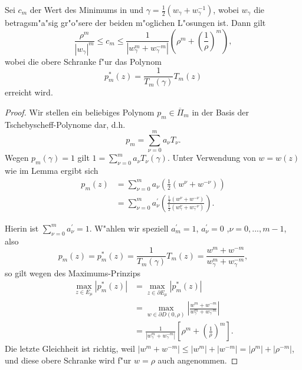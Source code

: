 \begin{sa}\label{cmschranke_sa}
Sei $c_m$ der Wert des Minimums in  
und $\gamma = \frac{1}{2}(w_{\gamma} + w_{\gamma}^{-1})$, 
wobei $w_{\gamma}$ die betragsm"a"sig gr"o"sere der beiden m"oglichen L"osungen ist.
Dann gilt
\[
\frac{\rho^m}{|w_{\gamma}|^m} \le c_m \le \frac{1}{|w_{\gamma}^m+w_{\gamma}^{-m}|}\left(\rho^m + \left(\frac{1}{\rho}\right)^m \right),
\]
wobei die obere Schranke f"ur das Polynom 
\[
p^*_m(z) = \frac{1}{T_m(\gamma)} T_m(z)
\]
erreicht wird.
\end{sa}
\begin{proof}
Wir stellen ein beliebiges Polynom $p_m \in \overline{\Pi}_m$ in der Basis der Tschebyscheff-Polynome dar, d.h.
\[
p_m = \sum\limits_{\nu=0}^{m} a_{\nu}T_{\nu}.
\]
Wegen $p_m(\gamma) = 1$ gilt $1 = \sum\limits_{\nu=0}^{m} a_{\nu}T_{\nu}(\gamma)$. Unter
Verwendung von $w = w(z)$ wie im Lemma  ergibt sich
\begin{align*}
p_m(z) &= \sum\limits_{\nu=0}^{m} a_{\nu}\left( \frac{1}{2}\left( w^{\nu} + w^{-\nu} \right) \right) \\
&= \sum\limits_{\nu=0}^{m} a^{'}_{\nu}\left( \frac{\frac{1}{2}\left( w^{\nu} + w^{-\nu} \right)}{\frac{1}{2}\left( w_{\gamma}^{\nu} 
		+ w_{\gamma}^{-\nu} \right)} \right).
\end{align*}

Hierin ist $\sum\limits_{\nu=0}^{m} a^{'}_{\nu} = 1$. W"ahlen wir speziell
$a^{'}_m = 1$, $a^{'}_{\nu} = 0$ ,$ \nu = 0,...,m-1$,
also
\[
 p_m(z) = p_m^*(z) = \frac{1}{T_m(\gamma)} T_m(z) = \frac{w^m + w^{-m} }{ w_{\gamma}^m + w_{\gamma}^{-m} }, 
\]
so gilt wegen des Maximums-Prinzips 
\begin{align*}
\underset{z \in E_{\mu} }{\max} |p_m^*(z)|&=\underset{z \in \partial E_{\mu} }{\max} |p_m^*(z)| \\
&= \underset{w \in \partial D(0,\rho)}{\max} \left| \frac{w^m + w^{-m} }{ w_{\gamma}^m + w_{\gamma}^{-m} } \right| \\
&= \frac{1}{|w_{\gamma}^m + w_{\gamma}^{-m}|} \left[ \rho^m + \left(\frac{1}{\rho}\right)^m\right].
\end{align*}
Die letzte Gleichheit ist richtig, weil $|w^m + w^{-m}| \leq |w^m| + |w^{-m}| =
|\rho^m| + |\rho^{-m}|$,
und diese obere Schranke wird f"ur $w = \rho$ auch angenommen.


\end{proof}
